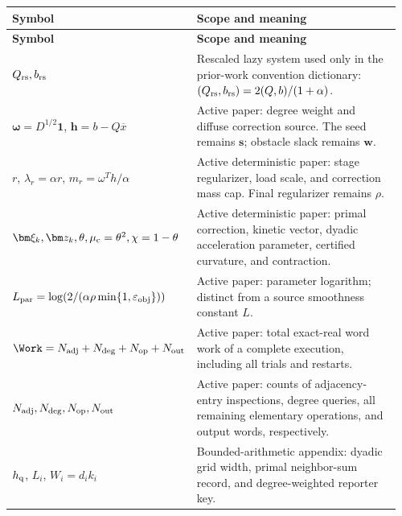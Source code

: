 

\begin{longtable}{@{}>{\raggedright\arraybackslash}p{0.36\linewidth}>{\raggedright\arraybackslash}p{0.60\linewidth}@{}}
\toprule
\textbf{Symbol} & \textbf{Scope and meaning} \\
\midrule
\endfirsthead
\toprule
\textbf{Symbol} & \textbf{Scope and meaning} \\
\midrule
\endhead
\bottomrule
\endfoot
$Q_{\rm rs},b_{\rm rs}$ & Rescaled lazy system used only in the prior-work convention dictionary: $(Q_{\rm rs},b_{\rm rs})=2(Q,b)/(1+\alpha)$. \\
$\bm\omega=D^{1/2}\mathbf1$, $\bm h=b-Q\overline x$ & Active paper: degree weight and diffuse correction source. The seed remains $\bm s$; obstacle slack remains $\bm w$. \\
$r$, $\lambda_r=\alpha r$, $m_r=\omega^Th/\alpha$ & Active deterministic paper: stage regularizer, load scale, and correction mass cap. Final regularizer remains $\rho$. \\
$\bm\xi_k,\bm z_k,\theta,\mu_{\rm c}=\theta^2,\chi=1-\theta$ & Active deterministic paper: primal correction, kinetic vector, dyadic acceleration parameter, certified curvature, and contraction. \\
$L_{\rm par}=\log(2/(\alpha\rho\min\{1,\varepsilon_{\rm obj}\}))$ & Active paper: parameter logarithm; distinct from a source smoothness constant $L$. \\
$\Work=N_{\rm adj}+N_{\rm deg}+N_{\rm op}+N_{\rm out}$ & Active paper: total exact-real word work of a complete execution, including all trials and restarts. \\
$N_{\rm adj},N_{\rm deg},N_{\rm op},N_{\rm out}$ & Active paper: counts of adjacency-entry inspections, degree queries, all remaining elementary operations, and output words, respectively. \\
$h_{\rm q}$, $L_i$, $W_i=d_i k_i$ & Bounded-arithmetic appendix: dyadic grid width, primal neighbor-sum record, and degree-weighted reporter key. \\

\end{longtable}
